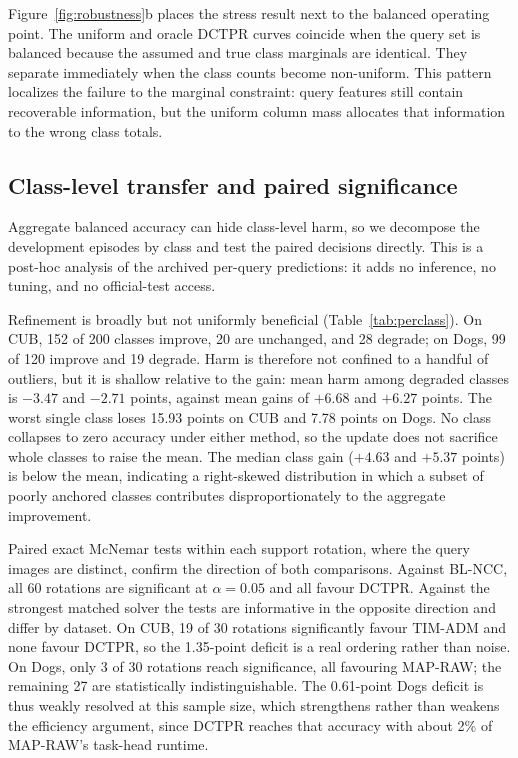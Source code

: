 \documentclass[]{spie}
\newcommand{\method}{\textsc{DCTPR}\xspace}
\begin{document}
Figure~\ref{fig:robustness}b places the stress result next to the balanced
operating point. The uniform and oracle DCTPR curves coincide when the query set
is balanced because the assumed and true class marginals are identical. They
separate immediately when the class counts become non-uniform. This pattern
localizes the failure to the marginal constraint: query features still contain
recoverable information, but the uniform column mass allocates that information
to the wrong class totals.

\subsection{Class-level transfer and paired significance}
\label{sec:perclass}

Aggregate balanced accuracy can hide class-level harm, so we decompose the
development episodes by class and test the paired decisions directly. This is a
post-hoc analysis of the archived per-query predictions: it adds no inference,
no tuning, and no official-test access.

Refinement is broadly but not uniformly beneficial (Table~\ref{tab:perclass}).
On CUB, 152 of 200 classes improve, 20 are unchanged, and 28 degrade; on Dogs,
99 of 120 improve and 19 degrade. Harm is therefore not confined to a handful of
outliers, but it is shallow relative to the gain: mean harm among degraded
classes is $-3.47$ and $-2.71$ points, against mean gains of $+6.68$ and
$+6.27$ points. The worst single class loses 15.93 points on CUB and 7.78 points
on Dogs. No class collapses to zero accuracy under either method, so the update
does not sacrifice whole classes to raise the mean. The median class gain
($+4.63$ and $+5.37$ points) is below the mean, indicating a right-skewed
distribution in which a subset of poorly anchored classes contributes
disproportionately to the aggregate improvement.

Paired exact McNemar tests within each support rotation, where the query images
are distinct, confirm the direction of both comparisons. Against BL-NCC, all 60
rotations are significant at $\alpha=0.05$ and all favour \method. Against the
strongest matched solver the tests are informative in the opposite direction and
differ by dataset. On CUB, 19 of 30 rotations significantly favour TIM-ADM and
none favour \method, so the 1.35-point deficit is a real ordering rather than
noise. On Dogs, only 3 of 30 rotations reach significance, all favouring
MAP-RAW; the remaining 27 are statistically indistinguishable. The 0.61-point
Dogs deficit is thus weakly resolved at this sample size, which strengthens
rather than weakens the efficiency argument, since \method reaches that accuracy
with about 2\% of MAP-RAW's task-head runtime.
\end{document}
